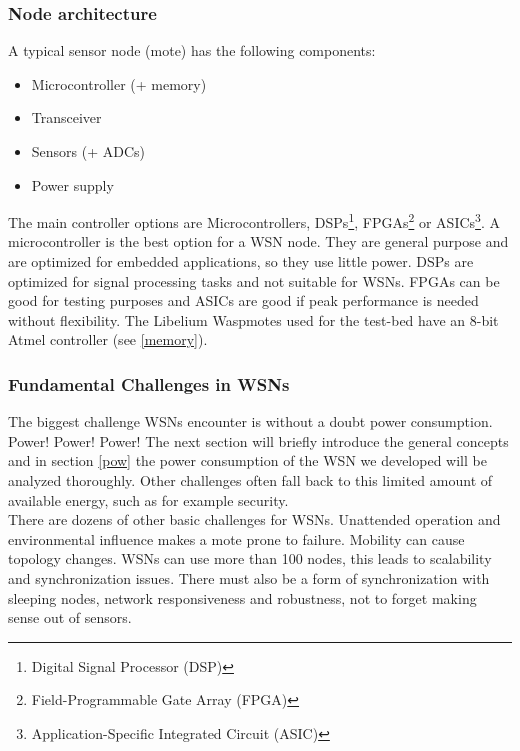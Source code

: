 \subsubsection{Node architecture}
A typical sensor node (mote) has the following components:
\begin{itemize}
\item Microcontroller (+ memory)
\item Transceiver
\item Sensors (+ ADCs)
\item Power supply
\end{itemize}
The main controller options are Microcontrollers, DSPs\footnote{Digital Signal Processor (DSP)}, FPGAs\footnote{Field-Programmable Gate Array (FPGA)} or ASICs\footnote{Application-Specific Integrated Circuit (ASIC)}. A microcontroller is the best option for a WSN node. They are general purpose and are optimized for embedded applications, so they use little power. DSPs are optimized for signal processing tasks and not suitable for WSNs. FPGAs can be good for testing purposes and ASICs are good if peak performance is needed without flexibility. The Libelium Waspmotes used for the test-bed have an 8-bit Atmel controller (see \ref{memory}).
\subsubsection{Fundamental Challenges in WSNs}
The biggest challenge WSNs encounter is without a doubt power consumption. Power! Power! Power! The next section will briefly introduce the general concepts and in section \ref{pow} the power consumption of the WSN we developed will be analyzed thoroughly. Other challenges often fall back to this limited amount of available energy, such as for example security.\\
There are dozens of other basic challenges for WSNs. Unattended operation and environmental influence makes a mote prone to failure. Mobility can cause topology changes. WSNs can use more than 100 nodes, this leads to scalability and synchronization issues. There must also be a form of synchronization with sleeping nodes, network responsiveness and robustness, not to forget making sense out of sensors.
